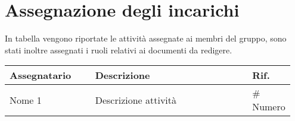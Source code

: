 \documentclass[a4paper, 12pt]{article}
\begin{document}
\section{Assegnazione degli incarichi}
In tabella vengono riportate le attività assegnate ai membri del gruppo, sono stati inoltre assegnati i ruoli relativi ai documenti da redigere.
\begin{center}
    {
    \renewcommand{\arraystretch}{1.5}
    \begin{tabular}{p{0.30\linewidth}p{0.55\linewidth}p{0.10\linewidth}}
        \textbf{Assegnatario}    &   \textbf{Descrizione}   & \textbf{Rif.}     \\
        \hline
        Nome 1    & Descrizione attività                    & \# Numero          \\
    \end{tabular}
    }
\end{center}
\end{document}
